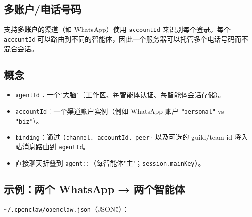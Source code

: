 \subsection{多账户/电话号码}


支持\textbf{多账户}的渠道（如 WhatsApp）使用 \texttt{accountId} 来识别每个登录。每个 \texttt{accountId} 可以路由到不同的智能体，因此一个服务器可以托管多个电话号码而不混合会话。

\subsection{概念}


\begin{itemize}
  \item \texttt{agentId}：一个"大脑"（工作区、每智能体认证、每智能体会话存储）。
  \item \texttt{accountId}：一个渠道账户实例（例如 WhatsApp 账户 \texttt{"personal"} vs \texttt{"biz"}）。
  \item \texttt{binding}：通过 \texttt{(channel, accountId, peer)} 以及可选的 guild/team id 将入站消息路由到 \texttt{agentId}。
  \item 直接聊天折叠到 \texttt{agent::}（每智能体"主"；\texttt{session.mainKey}）。
\end{itemize}


\subsection{示例：两个 WhatsApp → 两个智能体}


\texttt{\textasciitilde{}/.openclaw/openclaw.json}（JSON5）：

